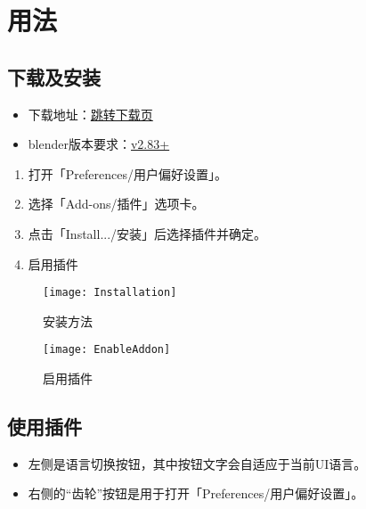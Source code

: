 \documentclass{../../PublicResources/DocClass}
\begin{document}
    \section{用法}

    \subsection{下载及安装}
    \begin{itemize}
        \item 下载地址：\href{https://github.com/Mister-Kin/ToggleLanguage/releases/latest}{跳转下载页}
        \item blender版本要求：\href{https://www.blender.org/download/}{v2.83+}
    \end{itemize}

    \begin{enumerate}
        \item 打开「Preferences/用户偏好设置」。
        \item 选择「Add-ons/插件」选项卡。
        \item 点击「Install.../安装」后选择插件并确定。
        \item 启用插件
    \end{enumerate}

    \begin{figure}[htbp]
        \begin{minipage}[t]{0.45\textwidth}
            \texttt{[image: Installation]}
            \caption*{安装方法}
        \end{minipage}
        \qquad
        \begin{minipage}[t]{0.45\textwidth}
            \texttt{[image: EnableAddon]}
            \caption*{启用插件}
        \end{minipage}
    \end{figure}

    \subsection{使用插件}
    \begin{itemize}
        \item 左侧是语言切换按钮，其中按钮文字会自适应于当前UI语言。
        \item 右侧的“齿轮”按钮是用于打开「Preferences/用户偏好设置」。
    \end{itemize}
\end{document}
